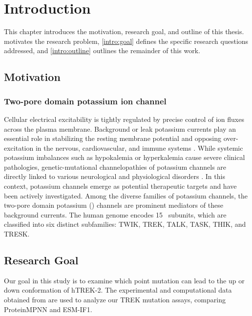 \chapter{Introduction}
This chapter introduces the motivation, research goal, and outline of this thesis.  motivates the research problem, \autoref{intro:goal} defines the specific research questions addressed, and \autoref{intro:outline} outlines the remainder of this work.

\section{Motivation}\label{intro:motiv}
\subsection{Two-pore domain potassium ion channel}
Cellular electrical excitability is tightly regulated by precise control of ion fluxes across the plasma membrane. Background or leak potassium currents play an essential role in stabilizing the resting membrane potential and opposing over-excitation in the nervous, cardiovascular, and immune systems \parencite{nichollsNeuronBrainCellular1992}. While systemic potassium imbalances such as hypokalemia or hyperkalemia cause severe clinical pathologies, genetic-mutational channelopathies of potassium channels are directly linked to various neurological and physiological disorders \parencite{turkaydinCrosstalkFilterGate2026, baukalCalciumdependentActivationTREK12025, kimUnravelingMolecularReason2024}. In this context, potassium channels emerge as potential therapeutic targets and have been actively investigated. 
Among the diverse families of potassium channels, the two-pore domain potassium (\KtwoP) channels are prominent mediators of these background currents. The human genome encodes 15 \KtwoP\ subunits, which are classified into six distinct subfamilies: TWIK, TREK, TALK, TASK, THIK, and TRESK.

\section{Research Goal}\label{intro:goal}
Our goal in this study is to examine which point mutation can lead to the up or down conformation of hTREK-2. The experimental and computational data obtained from \textcite{musinszkiUpstateTransitionDefault2026} are used to analyze our TREK mutation assays, comparing ProteinMPNN and ESM-IF1. 

